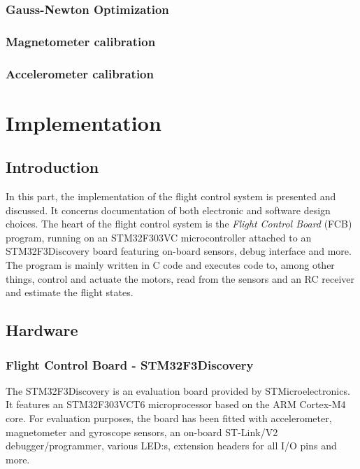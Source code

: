 \documentclass[a4paper]{report}
\begin{document}
	\section{Gauss-Newton Optimization}

	\section{Magnetometer calibration}

	\section{Accelerometer calibration}

%
%
\part{Implementation}

\chapter{Introduction}
In this part, the implementation of the flight control system is presented and discussed. It concerns documentation of both electronic and software design choices. The heart of the flight control system is the \emph{Flight Control Board} (FCB) program, running on an STM32F303VC microcontroller attached to an STM32F3Discovery board featuring on-board sensors, debug interface and more. The program is mainly written in C code and executes code to, among other things, control and actuate the motors, read from the sensors and an RC receiver and estimate the flight states.

\chapter{Hardware}

	\section{Flight Control Board - STM32F3Discovery}
The STM32F3Discovery is an evaluation board provided by STMicroelectronics. It features an STM32F303VCT6 microprocessor based on the ARM Cortex-M4 core. For evaluation purposes, the board has been fitted with accelerometer, magnetometer and gyroscope sensors, an on-board ST-Link/V2 debugger/programmer, various LED:s, extension headers for all I/O pins and more.
\end{document}
